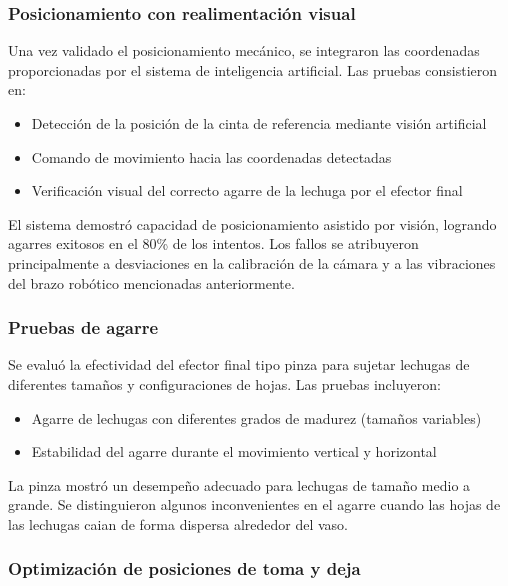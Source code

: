 \subsubsection{Posicionamiento con realimentación visual}

Una vez validado el posicionamiento mecánico, se integraron las coordenadas proporcionadas por el sistema de inteligencia artificial. Las pruebas consistieron en:

\begin{itemize}[label=$\bullet$]
    \item Detección de la posición de la cinta de referencia mediante visión artificial
    \item Comando de movimiento hacia las coordenadas detectadas
    \item Verificación visual del correcto agarre de la lechuga por el efector final
\end{itemize}

El sistema demostró capacidad de posicionamiento asistido por visión, logrando agarres exitosos en el 80\% de los intentos. Los fallos se atribuyeron principalmente a desviaciones en la calibración de la cámara y a las vibraciones del brazo robótico mencionadas anteriormente.

\subsubsection{Pruebas de agarre}

Se evaluó la efectividad del efector final tipo pinza para sujetar lechugas de diferentes tamaños y configuraciones de hojas. Las pruebas incluyeron:

\begin{itemize}[label=$\bullet$]
    \item Agarre de lechugas con diferentes grados de madurez (tamaños variables)
    \item Estabilidad del agarre durante el movimiento vertical y horizontal
\end{itemize}

La pinza mostró un desempeño adecuado para lechugas de tamaño medio a grande. Se distinguieron algunos inconvenientes en el agarre cuando las hojas de las lechugas caian de forma dispersa alrededor del vaso.

\subsubsection{Optimización de posiciones de toma y deja}

